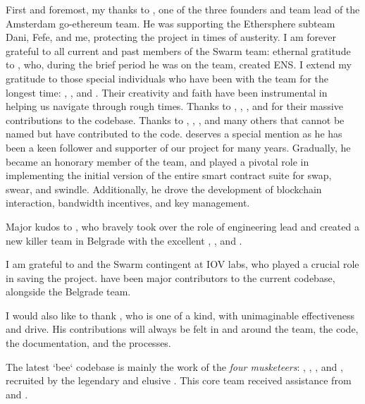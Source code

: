 First and foremost, my thanks to , one of the three founders and team lead of the Amsterdam go-ethereum team. He was supporting the Ethersphere subteam Dani, Fefe, and me, protecting the project in times of austerity.
I am forever grateful to all current and past members of the Swarm team: ethernal gratitude to , who, during the brief period he was on the team, created ENS. I extend my gratitude to those special individuals who have been with the team for the longest time: , , and . Their creativity and faith have been instrumental in helping us navigate through rough  times. Thanks to , , , and  for their massive contributions to the codebase. Thanks to , , , and many others that cannot be named but have contributed to the code.
 deserves a special mention as he has been a keen follower and supporter of our project for many years. Gradually, he became an honorary member of the team, and played a pivotal role in implementing the initial version of the entire smart contract suite for swap, swear, and swindle. Additionally, he drove the development of blockchain interaction, bandwidth incentives, and key management.

Major kudos to , who bravely took over the role of engineering lead and created a new killer team in Belgrade with the excellent , , and .  

I am grateful to  and the Swarm contingent at IOV labs, who played a crucial role in saving the project.  have been major contributors to the current codebase, alongside the Belgrade team. 

I would also like to thank , who is one of a kind, with unimaginable effectiveness and drive. His contributions will always be felt in and around the team, the code, the documentation, and the processes.

The latest `bee` codebase is mainly the work of the \emph{four musketeers}: , , , and , recruited by the legendary and elusive . This core team received assistance from  and .



